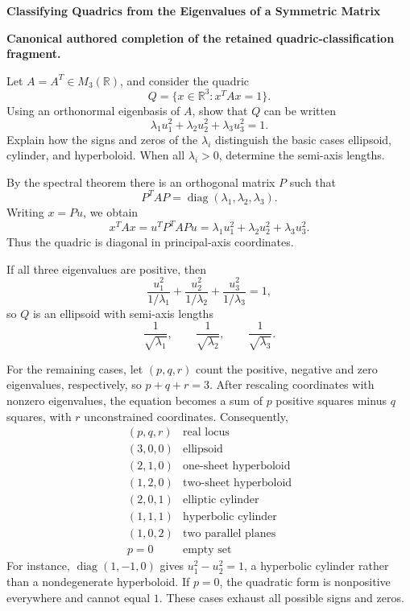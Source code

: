 \begin{problem}[CP-I-0005]
\label{prob:cp-i-0005}
\textbf{Classifying Quadrics from the Eigenvalues of a Symmetric Matrix}

\textbf{Canonical authored completion of the retained quadric-classification fragment.}

\hspace*{1.5em}Let \(A=A^T\in M_3(\mathbb R)\), and consider the quadric
\[
Q=\{x\in\mathbb R^3:x^TAx=1\}.
\]
Using an orthonormal eigenbasis of \(A\), show that \(Q\) can be written
\[
\lambda_1u_1^2+\lambda_2u_2^2+\lambda_3u_3^2=1.
\]
Explain how the signs and zeros of the \(\lambda_i\) distinguish the basic cases
ellipsoid, cylinder, and hyperboloid. When all \(\lambda_i>0\), determine the semi-axis lengths.
\end{problem}

\begin{solution}
By the spectral theorem there is an orthogonal matrix \(P\) such that
\[
P^TAP=\operatorname{diag}(\lambda_1,\lambda_2,\lambda_3).
\]
Writing \(x=Pu\), we obtain
\[
x^TAx
=
u^TP^TAPu
=
\lambda_1u_1^2+\lambda_2u_2^2+\lambda_3u_3^2.
\]
Thus the quadric is diagonal in principal-axis coordinates.

If all three eigenvalues are positive, then
\[
\frac{u_1^2}{1/\lambda_1}
+\frac{u_2^2}{1/\lambda_2}
+\frac{u_3^2}{1/\lambda_3}
=1,
\]
so \(Q\) is an ellipsoid with semi-axis lengths
\[
\frac1{\sqrt{\lambda_1}},\qquad
\frac1{\sqrt{\lambda_2}},\qquad
\frac1{\sqrt{\lambda_3}}.
\]

For the remaining cases, let \((p,q,r)\) count the positive, negative and zero
eigenvalues, respectively, so \(p+q+r=3\). After rescaling coordinates with nonzero
eigenvalues, the equation becomes a sum of \(p\) positive squares minus \(q\) squares,
with \(r\) unconstrained coordinates. Consequently,
\[
\begin{array}{c|l}
(p,q,r)&\text{real locus}\\ \hline
(3,0,0)&\text{ellipsoid}\\
(2,1,0)&\text{one-sheet hyperboloid}\\
(1,2,0)&\text{two-sheet hyperboloid}\\
(2,0,1)&\text{elliptic cylinder}\\
(1,1,1)&\text{hyperbolic cylinder}\\
(1,0,2)&\text{two parallel planes}\\
p=0&\text{empty set}
\end{array}
\]
For instance, \(\operatorname{diag}(1,-1,0)\) gives \(u_1^2-u_2^2=1\),
a hyperbolic cylinder rather than a nondegenerate hyperboloid. If \(p=0\), the
quadratic form is nonpositive everywhere and cannot equal \(1\). These cases exhaust
all possible signs and zeros.
\end{solution}

